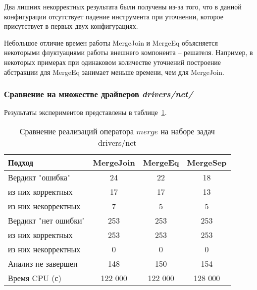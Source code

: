 Два лишних некорректных результата были получены из-за того, что в данной конфигурации отсутствует падение инструмента при уточнении, которое присутствует в первых двух конфигурациях.

Небольшое отличие времен работы MergeJoin и MergeEq объясняется некоторыми флуктуациями работы внешнего компонента -- решателя. 
Например, в некоторых примерах при одинаковом количестве уточнений построение абстракции для MergeEq занимает меньше времени, чем для MergeJoin.

\subsubsection{Сравнение на множестве драйверов \textit{drivers/net/} }

Результаты экспериментов представлены в таблице~\ref{table-drivers-merge}.

\begin{center}
  \begin{table}[h]\footnotesize \centering
  	\label{table-drivers-merge}
    \caption{Сравнение реализаций оператора $merge$ на наборе задач drivers/net}
    \begin{tabular}{ | l | c | c | c | }
      \hline
      Подход         				& MergeJoin	& MergeEq 	& MergeSep   \\ \hline
      Вердикт "ошибка" 				& 24    	& 22  		& 18         \\ 
  \hspace{0.5cm} из них корректных 	& 17 		& 17 		& 13      \\ 
  \hspace{0.5cm} из них некорректных & 7 		& 5 		& 5        \\ \hline
      Вердикт "нет ошибки"  		& 253      	& 253        & 253       \\ 
  \hspace{0.5cm} из них корректных 	& 253 		& 253    	& 253        \\
  \hspace{0.5cm} из них некорректных & 0 		& 0    		& 0         \\ \hline
      Анализ не завершен       		& 148     	& 150        & 154       \\ \hline
      Время CPU (с)   				& 122 000 	& 122 000    & 128 000    \\ 
      \hline
    \end{tabular}
  \end{table}
\end{center}


